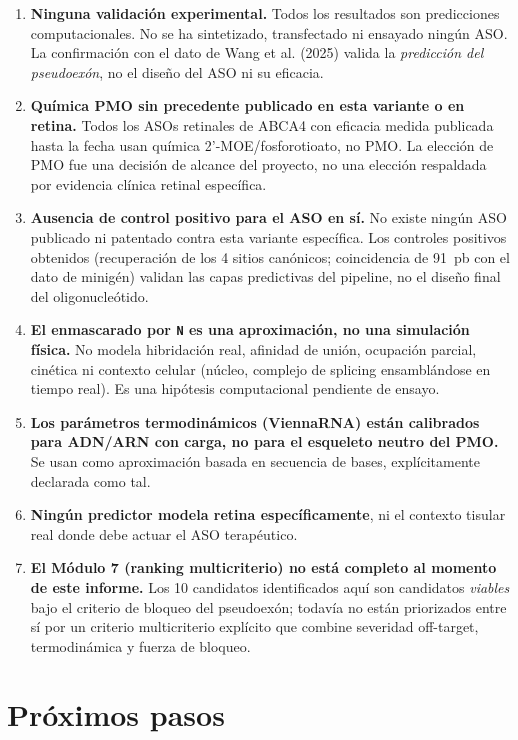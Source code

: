 \documentclass[11pt,a4paper]{article}
\begin{document}
\begin{enumerate}[leftmargin=*]
\item \textbf{Ninguna validación experimental.} Todos los resultados son predicciones computacionales. No se ha sintetizado, transfectado ni ensayado ningún ASO. La confirmación con el dato de Wang et al. (2025) valida la \emph{predicción del pseudoexón}, no el diseño del ASO ni su eficacia.
\item \textbf{Química PMO sin precedente publicado en esta variante o en retina.} Todos los ASOs retinales de ABCA4 con eficacia medida publicada hasta la fecha usan química 2'-MOE/fosforotioato, no PMO. La elección de PMO fue una decisión de alcance del proyecto, no una elección respaldada por evidencia clínica retinal específica.
\item \textbf{Ausencia de control positivo para el ASO en sí.} No existe ningún ASO publicado ni patentado contra esta variante específica. Los controles positivos obtenidos (recuperación de los 4 sitios canónicos; coincidencia de 91~pb con el dato de minigén) validan las capas predictivas del pipeline, no el diseño final del oligonucleótido.
\item \textbf{El enmascarado por \texttt{N} es una aproximación, no una simulación física.} No modela hibridación real, afinidad de unión, ocupación parcial, cinética ni contexto celular (núcleo, complejo de splicing ensamblándose en tiempo real). Es una hipótesis computacional pendiente de ensayo.
\item \textbf{Los parámetros termodinámicos (ViennaRNA) están calibrados para ADN/ARN con carga, no para el esqueleto neutro del PMO.} Se usan como aproximación basada en secuencia de bases, explícitamente declarada como tal.
\item \textbf{Ningún predictor modela retina específicamente}, ni el contexto tisular real donde debe actuar el ASO terapéutico.
\item \textbf{El Módulo 7 (ranking multicriterio) no está completo al momento de este informe.} Los 10 candidatos identificados aquí son candidatos \emph{viables} bajo el criterio de bloqueo del pseudoexón; todavía no están priorizados entre sí por un criterio multicriterio explícito que combine severidad off-target, termodinámica y fuerza de bloqueo.
\end{enumerate}

\section{Próximos pasos}
\end{document}
